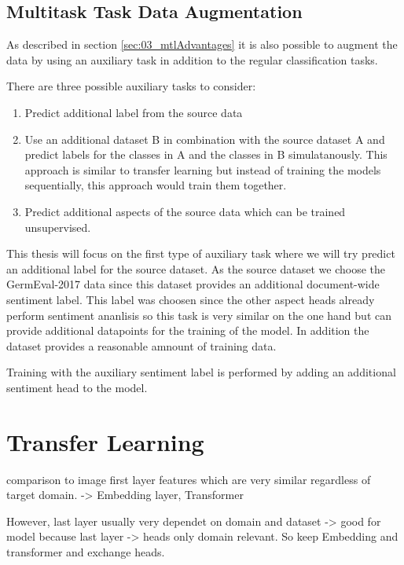 \subsection*{Multitask Task Data Augmentation}

As described in section \ref{sec:03_mtlAdvantages} it is also possible to augment the data by using an auxiliary task in addition to the regular classification tasks.

There are three possible auxiliary tasks to consider:


\begin{enumerate}
	\item Predict additional label from the source data
	\item Use an additional dataset B in combination with the source dataset A and predict labels for the classes in A and the classes in B simulatanously. This approach is similar to transfer learning but instead of training the models sequentially, this approach would train them together.
	\item Predict additional aspects of the source data which can be trained unsupervised.
\end{enumerate}

This thesis will focus on the first type of auxiliary task where we will try predict an additional label for the source dataset. As the source dataset we choose the GermEval-2017 data since this dataset provides an additional document-wide sentiment label. This label was choosen since the other aspect heads already perform sentiment ananlisis so this task is very similar on the one hand but can provide additional datapoints for the training of the model. In addition the dataset provides a reasonable amnount of training data.

Training with the auxiliary sentiment label is performed by adding an additional sentiment head to the model.



\section{Transfer Learning}
\label{sec:04_transferLearning}
comparison to image first layer features which are very similar regardless of target domain. \cite{Yosinski2014} -> Embedding layer, Transformer

However, last layer usually very dependet on domain and dataset -> good for model because last layer -> heads only domain relevant. So keep Embedding and transformer and exchange heads.

